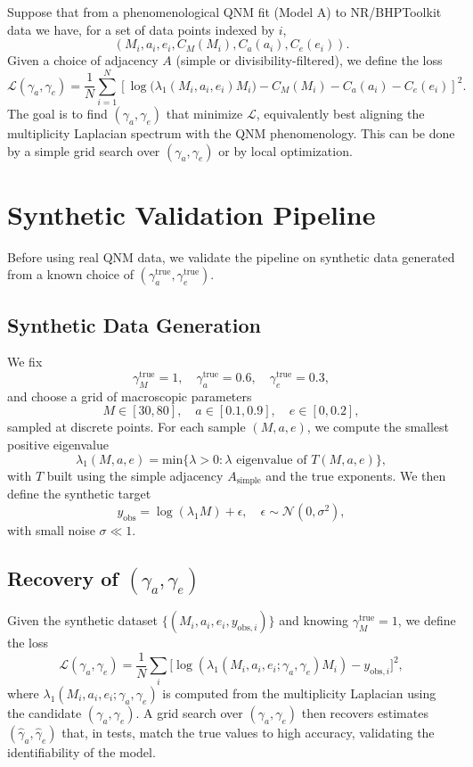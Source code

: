 \documentclass[11pt]{article}
\begin{document}
Suppose that from a phenomenological QNM fit (Model A) to NR/BHPToolkit data we have, for a set of data points indexed by $i$,
\[
  (M_i,a_i,e_i, C_M(M_i), C_a(a_i), C_e(e_i)).
\]
Given a choice of adjacency $A$ (simple or divisibility-filtered), we define the loss
\begin{equation}
  \mathcal{L}(\gamma_a,\gamma_e)
  = \frac{1}{N}\sum_{i=1}^{N}
  \left[
    \log\big(\lambda_1(M_i,a_i,e_i) M_i\big) - C_M(M_i) - C_a(a_i) - C_e(e_i)
  \right]^2.
\end{equation}
The goal is to find $(\gamma_a,\gamma_e)$ that minimize $\mathcal{L}$, equivalently best aligning the multiplicity Laplacian spectrum with the QNM phenomenology. This can be done by a simple grid search over $(\gamma_a,\gamma_e)$ or by local optimization.

\section{Synthetic Validation Pipeline}

Before using real QNM data, we validate the pipeline on synthetic data generated from a known choice of $(\gamma_a^{\text{true}},\gamma_e^{\text{true}})$.

\subsection{Synthetic Data Generation}

We fix
\[
  \gamma_M^{\text{true}} = 1,\quad \gamma_a^{\text{true}} = 0.6,\quad \gamma_e^{\text{true}} = 0.3,
\]
and choose a grid of macroscopic parameters
\[
  M \in [30,80],\quad a\in[0.1,0.9],\quad e\in[0,0.2],
\]
sampled at discrete points. For each sample $(M,a,e)$, we compute the smallest positive eigenvalue
\[
  \lambda_1(M,a,e) = \text{min}\{\lambda>0 : \lambda \text{ eigenvalue of } T(M,a,e)\},
\]
with $T$ built using the simple adjacency $A_{\text{simple}}$ and the true exponents. We then define the synthetic target
\[
  y_{\text{obs}} = \log(\lambda_1 M) + \epsilon,\quad \epsilon\sim\mathcal{N}(0,\sigma^2),
\]
with small noise $\sigma\ll 1$.

\subsection{Recovery of $(\gamma_a,\gamma_e)$}

Given the synthetic dataset $\{(M_i,a_i,e_i,y_{\text{obs},i})\}$ and knowing $\gamma_M^{\text{true}}=1$, we define the loss
\[
  \mathcal{L}(\gamma_a,\gamma_e) = \frac{1}{N}\sum_i
  \big[
    \log(\lambda_1(M_i,a_i,e_i;\gamma_a,\gamma_e) M_i) - y_{\text{obs},i}
  \big]^2,
\]
where $\lambda_1(M_i,a_i,e_i;\gamma_a,\gamma_e)$ is computed from the multiplicity Laplacian using the candidate $(\gamma_a,\gamma_e)$. A grid search over $(\gamma_a,\gamma_e)$ then recovers estimates $(\hat{\gamma}_a,\hat{\gamma}_e)$ that, in tests, match the true values to high accuracy, validating the identifiability of the model.
\end{document}
